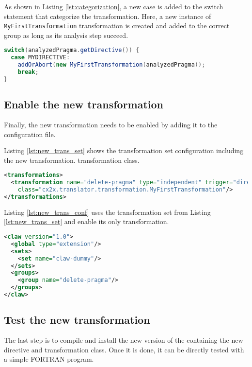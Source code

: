 As shown in Listing \ref{lst:categorization}, a new case is added to the switch
statement that categorize the transformation. Here, a new instance of
\lstinline|MyFirstTransformation| transformation is created and added to the
correct group as long as its analysis step succeed.

\begin{lstlisting}[label=lst:categorization, caption=ClawXcodeMlTranslator.java, language=java]
switch(analyzedPragma.getDirective()) {
  case MYDIRECTIVE:
    addOrAbort(new MyFirstTransformation(analyzedPragma));
    break;
}
\end{lstlisting}


\subsection{Enable the new transformation}
Finally, the new transformation needs to be enabled by adding it to the
configuration file.

Listing \ref{lst:new_trans_set} shows the transformation set configuration
including the new transformation.
transformation class.


\begin{lstlisting}[label=lst:new_trans_set, caption=claw-dummy-set.xml, language=xml]
<transformations>
  <transformation name="delete-pragma" type="independent" trigger="directive"
    class="cx2x.translator.transformation.MyFirstTransformation"/>
</transformations>
\end{lstlisting}

Listing \ref{lst:new_trans_conf} uses the transformation set from Listing
\ref{lst:new_trans_set} and enable its only transformation.

\begin{lstlisting}[label=lst:new_trans_conf, caption=claw-dummy.xml, language=xml]
<claw version="1.0">
  <global type="extension"/>
  <sets>
    <set name="claw-dummy"/>
  </sets>
  <groups>
    <group name="delete-pragma"/>
  </groups>
</claw>
\end{lstlisting}

\subsection{Test the new transformation}
The last step is to compile and install the new version of the \clawfcomp
containing the new directive and transformation class. Once it is done, it
can be directly tested with a simple FORTRAN program.

